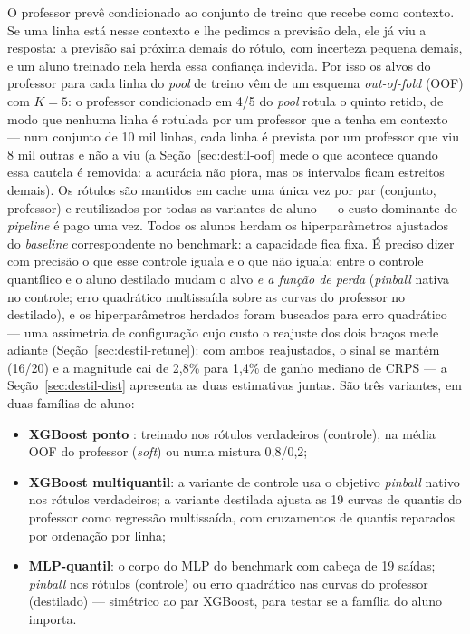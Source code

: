 O professor prevê condicionado ao conjunto de treino que recebe como
contexto. Se uma linha está nesse contexto e lhe pedimos a previsão
dela, ele já viu a resposta: a previsão sai próxima demais do rótulo,
com incerteza pequena demais, e um aluno treinado nela herda essa
confiança indevida. Por isso os alvos do professor para cada linha do
\emph{pool} de treino vêm de um
esquema \emph{out-of-fold} (OOF) com $K{=}5$: o professor condicionado
em 4/5 do \emph{pool} rotula o quinto retido, de modo que nenhuma linha é
rotulada por um professor que a tenha em contexto --- num conjunto de
10 mil linhas, cada linha é prevista por um professor que viu 8 mil
outras e não a viu (a Seção~\ref{sec:destil-oof} mede o que acontece
quando essa cautela é removida: a acurácia não piora, mas os
intervalos ficam estreitos demais). Os rótulos são
mantidos em cache uma única vez por par (conjunto, professor) e reutilizados por
todas as variantes de aluno --- o custo dominante do \emph{pipeline} é pago
uma vez. Todos os alunos herdam os hiperparâmetros ajustados do \emph{baseline}
correspondente no benchmark: a capacidade fica fixa. É preciso dizer
com precisão o que esse controle iguala e o que não iguala: entre o
controle quantílico e o aluno destilado mudam o alvo \emph{e a função
de perda} (\emph{pinball} nativa no controle; erro quadrático
multissaída sobre as curvas do professor no destilado), e os
hiperparâmetros herdados foram buscados para erro quadrático --- uma
assimetria de configuração cujo custo o reajuste dos dois braços
mede adiante (Seção~\ref{sec:destil-retune}): com ambos reajustados, o
sinal se mantém (16/20) e a magnitude cai de 2,8\% para 1,4\% de ganho
mediano de CRPS --- a Seção~\ref{sec:destil-dist} apresenta as duas
estimativas juntas. São
três variantes, em duas famílias de aluno:

\begin{itemize}
  \item \textbf{XGBoost ponto} \citep{chen2016}: treinado nos rótulos
    verdadeiros (controle), na média OOF do professor (\emph{soft}) ou
    numa mistura 0,8/0,2;
  \item \textbf{XGBoost multiquantil}: a variante de controle usa o
    objetivo \emph{pinball} nativo \citep{koenker1978} nos rótulos
    verdadeiros; a variante destilada ajusta as 19 curvas de quantis
    do professor como regressão multissaída, com cruzamentos de quantis
    reparados por ordenação por linha;
  \item \textbf{MLP-quantil}: o corpo do MLP do benchmark com cabeça
    de 19 saídas; \emph{pinball} nos rótulos (controle) ou erro
    quadrático nas curvas do professor (destilado) --- simétrico ao par
    XGBoost, para testar se a família do aluno importa.
\end{itemize}

